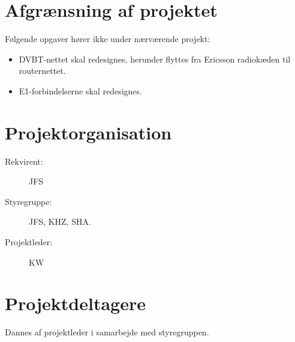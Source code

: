 \documentclass[11pt,a4paper]{article}
\begin{document}
\section{Afgrænsning af projektet}
Følgende opgaver hører ikke under nærværende projekt:
\begin{itemize}
\item DVBT-nettet skal redesignes, herunder flyttes fra Ericsson radiokæden til routernettet.
\item E1-forbindelserne skal redesignes.
\end{itemize}
\section{Projektorganisation}
\begin{description}
\item[Rekvirent:] JFS
\item[Styregruppe:] JFS, KHZ, SHA.	
\item[Projektleder:] KW
\end{description}
\section{Projektdeltagere}
Dannes af projektleder i samarbejde med styregruppen.
\end{document}
